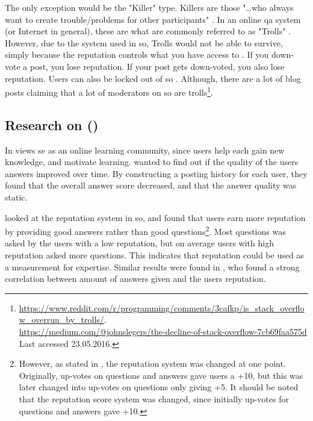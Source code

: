 The only exception would be the "Killer" type. 
Killers are those "\ldots who always want to create trouble/problems for other participants" \cite[p.~3]{Maan2013}. 
In an online \gls{qa} system (or Internet in general), these are what are commonly referred to as "Trolls" \cite{Fosdick2012, Atwood2015}. 
However, due to the system used in \gls{so}, Trolls would not be able to survive, simply because the reputation controls what you have access to \cite{Stackoverflow.com2016f}. 
If you down-vote a post, you lose reputation. 
If your post gets down-voted, you also lose reputation. 
Users can also be locked out of \gls{so} \cite{Atwood2009}.
Although, there are a lot of blog posts claiming that a lot of moderators on \gls{so} are 
trolls\footnote{\url{https://www.reddit.com/r/programming/comments/3cafkp/is\_stack_overflow\_overrun\_by\_trolls/}. \\	
	\url{https://medium.com/@johnslegers/the-decline-of-stack-overflow-7cb69faa575d} \\ 
	Last accessed 23.05.2016. 
}.



\subsection[Research on Stack Overflow]{Research on  ()}
\label{sec:research_on_so}
In \cite{Posnett2012} views \gls{se} as an online learning community, since users help each gain new knowledge, and motivate learning. 
\citet{Posnett2012} wanted to find out if the quality of the users answers improved over time. 
By constructing a posting history for each user, they found that the overall answer score decreased, and that the answer quality was static.

\citet{Movshovitz-Attias2013} looked at the reputation system in \gls{so}, and found that users earn more reputation by providing good answers rather than good 
questions\footnote{
	However, as stated in \citet[p.~3]{Movshovitz-Attias2013}, the reputation system was changed at one point. 
	Originally, up-votes on questions and answers gave users a +10, but this was later changed into up-votes on questions only giving +5. 
	It should be noted that the reputation score system was changed, since initially up-votes for questions and answers gave +10.
	}.
Most questions was asked by the users with a low reputation, but on average users with high reputation asked more questions. 
This indicates that reputation could be used as a measurement for expertise. 
Similar results were found in \cite{Ahmed2015}, who found a strong correlation between amount of answers given and the users reputation.




